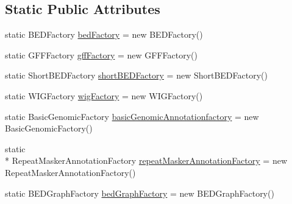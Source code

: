 \subsection*{Static Public Attributes}
\begin{DoxyCompactItemize}
\item 
static B\+E\+D\+Factory \hyperlink{classbroad_1_1core_1_1annotation_1_1_annotation_factory_factory_ae3999caf7c256c172721bed4056fed20}{bed\+Factory} = new B\+E\+D\+Factory()
\item 
static G\+F\+F\+Factory \hyperlink{classbroad_1_1core_1_1annotation_1_1_annotation_factory_factory_a1ca1d0758e6d3167487ecaa594aa46eb}{gff\+Factory} = new G\+F\+F\+Factory()
\item 
static Short\+B\+E\+D\+Factory \hyperlink{classbroad_1_1core_1_1annotation_1_1_annotation_factory_factory_a94f585b4a297312a21eb818684e81514}{short\+B\+E\+D\+Factory} = new Short\+B\+E\+D\+Factory()
\item 
static W\+I\+G\+Factory \hyperlink{classbroad_1_1core_1_1annotation_1_1_annotation_factory_factory_a638bc90b36aae25cf1d4dcad254cfcbe}{wig\+Factory} = new W\+I\+G\+Factory()
\item 
static Basic\+Genomic\+Factory \hyperlink{classbroad_1_1core_1_1annotation_1_1_annotation_factory_factory_a7e5263e9664737cf0571349c12a34d56}{basic\+Genomic\+Annotationfactory} = new Basic\+Genomic\+Factory()
\item 
static \\*
Repeat\+Masker\+Annotation\+Factory \hyperlink{classbroad_1_1core_1_1annotation_1_1_annotation_factory_factory_a9f7fd5ba24d908678afe37010f524894}{repeat\+Masker\+Annotation\+Factory} = new Repeat\+Masker\+Annotation\+Factory()
\item 
static B\+E\+D\+Graph\+Factory \hyperlink{classbroad_1_1core_1_1annotation_1_1_annotation_factory_factory_acfede683a4e3e01cd544ba8959432089}{bed\+Graph\+Factory} = new B\+E\+D\+Graph\+Factory()
\end{DoxyCompactItemize}


